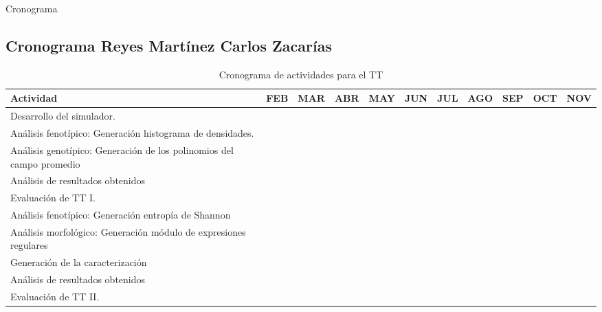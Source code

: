 \documentclass{article}
\begin{document}
\begin{section}{Cronograma}
        \subsection{Cronograma Reyes Martínez Carlos Zacarías }
            \begin{table}[H]
                \centering
                \caption{Cronograma de actividades para el TT}
                \label{my-label}
                \begin{tabular}{|p{5cm}|l|l|l|l|l|l|l|l|l|l|}
                    \hline
                    Actividad & FEB & MAR & ABR & MAY & JUN & JUL & AGO & SEP & OCT & NOV \\ \hline
                    Desarrollo del simulador.  & \cellcolor[gray]{0.73}  & \cellcolor[gray]{0.73} &  &  &  &  &  &  &  &  \\ \hline
                    Análisis fenotípico: Generación histograma de densidades.  &  & & \cellcolor[gray]{0.73}   &  &  &  &  &  &  &  \\ \hline
                    Análisis genotípico: Generación de los polinomios del campo promedio &  &  &  & \cellcolor[gray]{0.73}  &  &  &  &  &  &  \\ \hline
                    Análisis de resultados obtenidos &  &  &  & \cellcolor[gray]{0.73}  & \cellcolor[gray]{0.73}  &  &  &  &  &  \\ \hline
                    Evaluación de TT I.&  &  &  &  & \cellcolor[gray]{0.73}  &  &  &  &  &  \\ \hline
                    Análisis fenotípico: Generación entropía de Shannon&  &  &  &  &   & \cellcolor[gray]{0.73}  &  &  &  &  \\ \hline
                    Análisis morfológico: Generación módulo de expresiones regulares &  &  &  &  &  &  & \cellcolor[gray]{0.73}  &  &  &  \\ \hline
                    Generación de la caracterización&  &  &  &  &  &  &  & \cellcolor[gray]{0.73}  & \cellcolor[gray]{0.73}   &  \\ \hline
                    Análisis de resultados obtenidos&  &  &  &  &  &  &  &  & \cellcolor[gray]{0.73}  &  \\ \hline
                    Evaluación de TT II.&  &  &  &  &  &  &  &  &  & \cellcolor[gray]{0.73} \\ \hline
                \end{tabular}
            \end{table}
    \end{section}
     \clearpage
    \newpage
    
\end{document}
